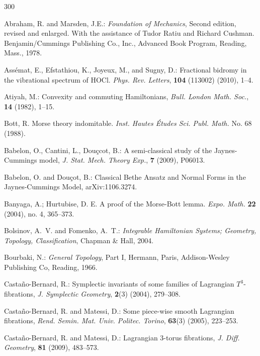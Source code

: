 \documentclass[11pt]{article}
\begin{document}
{\small 
  \begin{thebibliography}{300}

   Abraham, R. and Marsden, J.E.: \textit{Foundation
      of Mechanics}, Second edition, revised and enlarged. With the
    assistance of Tudor Ratiu and Richard Cushman. Benjamin/Cummings
    Publishing Co., Inc., Advanced Book Program, Reading, Mass., 1978.

   Ass{\'e}mat, E., Efstathiou, K., Joyeux, M., and
    Sugny, D.: Fractional bidromy in the vibrational spectrum of
    {HOCl}. \emph{Phys. Rev. Letters}, \textbf{104} (113002) (2010),
    1--4.

   Atiyah, M.: Convexity and commuting Hamiltonians,
    {\em Bull. London Math. Soc.}, {\bf 14} (1982), 1--15.

   Bott, R.  Morse theory indomitable.
    \textit{Inst. Hautes Études Sci. Publ. Math.} No. 68 (1988).


   Babelon, O., Cantini, L., Dou\c{c}cot, B.: A
    semi-classical study of the Jaynes-Cummings model,
    \emph{J. Stat. Mech. Theory Exp.}, \textbf{7} (2009), P06013.

   Babelon, O. and Dou\c{c}ot, B.: Classical Bethe
    Ansatz and Normal Forms in the Jaynes-Cummings Model,
    arXiv:1106.3274.

   Banyaga, A.; Hurtubise, D. E.  A proof of the
    Morse-Bott lemma.  \textit{Expo. Math.} \textbf{22} (2004), no. 4,
    365–373.
    
   Bolsinov, A.~V.  and Fomenko, A.~T.:
    \textit{Integrable Hamiltonian Systems; Geometry, Topology,
      Classification}, Chapman \& Hall, 2004.

   Bourbaki, N.: \textit{General Topology}, Part
    I, Hermann, Paris, Addison-Wesley Publishing Co, Reading, 1966.

   Casta{\~n}o-Bernard, R.: Symplectic invariants
    of some families of Lagrangian $T^3$-fibrations,
    \textit{J. Symplectic Geometry}, \textbf{2}(3) (2004), 279--308.

   Casta{\~n}o-Bernard, R. and Matessi, D.: Some
    piece-wise smooth Lagrangian fibrations,
    \textit{Rend. Semin. Mat. Univ. Politec. Torino}, {\bf 63}(3)
    (2005), 223--253.

   Casta{\~n}o-Bernard, R. and Matessi, D.:
    Lagrangian $3$-torus fibrations, \textit{J. Diff. Geometry},
    \textbf{81} (2009), 483--573.


\end{thebibliography}}
\end{document}
